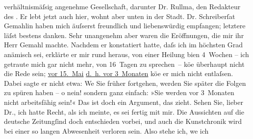 \begin{ledgroupsized}[t]{13cm}
                    verhältnismäſsig angenehme Gesellschaft, darunter Dr. Rullma{\geminationn}, den Redakteur des \label{K_L00176_2v}\label{K_L00176_2h}. Er lebt
                    jetzt auch hier, wohnt aber unten in der Stadt.\pend
           \pstart
           Dr. Schreiberſa{\geminationm}t Gemahlin haben mich
                    äuſserst freundlich und liebenswürdig empfangen; letztere läſst bestens danken.
                    Sehr unangenehm aber waren die Eröffnungen, die mir ihr Herr Gemahl machte. Nachdem er konstatiert
                    hatte, daſs ich im höchsten Grad anämisch sei, erklärte er mir rund heraus, von
                    einer Heilung bi{\geminationn}en 4 Wochen – ich getraute mich
                    gar nicht mehr, von 16 Tagen zu sprechen – kö{\geminationn}e
                    überhaupt nicht die Rede sein; \uline{vor
                            15. Mai}{ }{\pb}\uline{d. h. vor 3 Monaten} kö{\geminationn}e er mich nicht entlaſsen. Dabei sagte er nicht
                    etwa: We{\geminationn} Sie früher fortgehen, werden Sie später
                    die Folgen zu spüren haben – o nein! sondern ganz einfach: »Sie werden vor
                    3 Monaten nicht arbeitsfähig sein!« Das ist doch ein Argument, das zieht.\pend
           \pstart
           Sehen Sie, lieber Dr., ich hatte Recht, als ich meinte, es sei fertig mit mir.
                    Die Aussichten auf die deutsche Zeitungſind doch entschieden vorbei, und auch die Kunstchronik wird bei einer so langen
                    Abwesenheit verloren sein. Also stehe ich, we{\geminationn} ich

\end{ledgroupsized}
